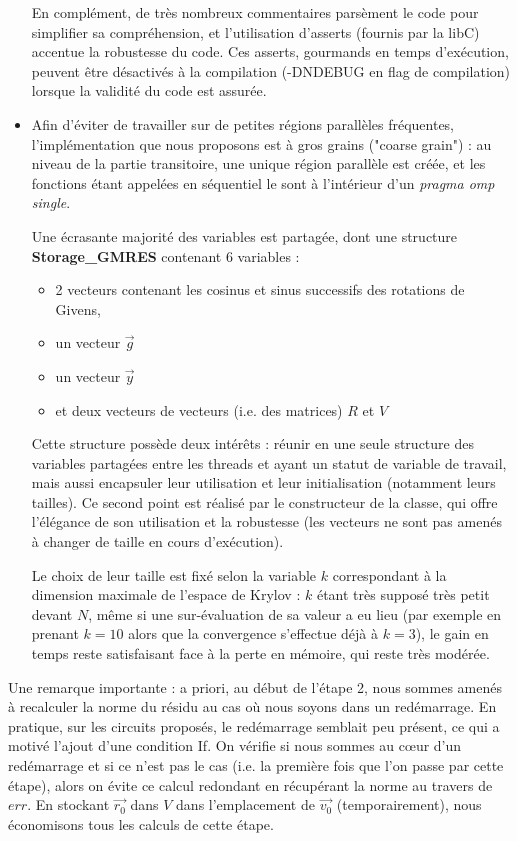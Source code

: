\documentclass[11pt,a4paper,oneside]{memoir}
\theoremstyle{definition}
\theoremstyle{remark}
\theoremstyle{plain}
\begin{document}
\begin{itemize}
En complément, de très nombreux commentaires parsèment le code pour simplifier sa compréhension, et l'utilisation d'asserts (fournis par la libC) accentue la robustesse du code. Ces asserts, gourmands en temps d'exécution, peuvent être désactivés à la compilation (-DNDEBUG en flag de compilation) lorsque la validité du code est assurée.

\item Afin d'éviter de travailler sur de petites régions parallèles fréquentes, l'implémentation que nous proposons est à gros grains ("coarse grain") : au niveau de la partie transitoire, une unique région parallèle est créée, et les fonctions étant appelées en séquentiel le sont à l'intérieur d'un \textit{pragma omp single}.

Une écrasante majorité des variables est partagée, dont une structure \textbf{Storage\_GMRES} contenant 6 variables :
\begin{itemize}
\item 2 vecteurs contenant les cosinus et sinus successifs des rotations de Givens,
\item un vecteur $\vec{g}$
\item un vecteur $\vec{y}$
\item et deux vecteurs de vecteurs (i.e. des matrices) $R$ et $V$
\end{itemize}

Cette structure possède deux intérêts : réunir en une seule structure des variables partagées entre les threads et ayant un statut de variable de travail, mais aussi encapsuler leur utilisation et leur initialisation (notamment leurs tailles). Ce second point est réalisé par le constructeur de la classe, qui offre l'élégance de son utilisation et la robustesse (les vecteurs ne sont pas amenés à changer de taille en cours d'exécution).

Le choix de leur taille est fixé selon la variable $k$ correspondant à la dimension maximale de l'espace de Krylov : $k$ étant très supposé très petit devant $N$, même si une sur-évaluation de sa valeur a eu lieu (par exemple en prenant $k=10$ alors que la convergence s'effectue déjà à $k=3$), le gain en temps reste satisfaisant face à la perte en mémoire, qui reste très modérée.
\end{itemize}

Une remarque importante : a priori, au début de l'étape 2, nous sommes amenés à recalculer la norme du résidu au cas où nous soyons dans un redémarrage. En pratique, sur les circuits proposés, le redémarrage semblait peu présent, ce qui a motivé l'ajout d'une condition If. On vérifie si nous sommes au cœur d'un redémarrage et si ce n'est pas le cas (i.e. la première fois que l'on passe par cette étape), alors on évite ce calcul redondant en récupérant la norme au travers de $err$. En stockant $\vec{r_0}$ dans $V$ dans l'emplacement de $\vec{v_0}$ (temporairement), nous économisons tous les calculs de cette étape.
\end{document}
